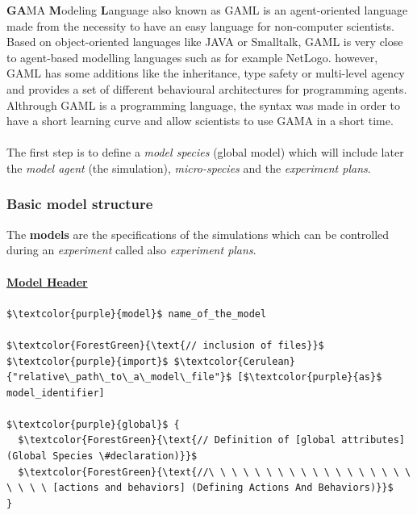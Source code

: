 \documentclass[12pt, a4paper]{memoir} %
\begin{document}
			\textbf{GA}MA \textbf{M}odeling \textbf{L}anguage also known as GAML is an agent-oriented language made from the necessity to have an easy language for non-computer scientists.
			Based on object-oriented languages like JAVA or Smalltalk, GAML is very close to agent-based modelling languages such as for example NetLogo. however, GAML has some additions like the
			inheritance, type safety or multi-level agency and provides a set of different behavioural architectures for programming agents.
			Althrough GAML is a programming language, the syntax was made in order to have a short learning curve and allow scientists to use GAMA in a short time.
			\paragraph{}
			The first step is to define a \textit{model species} (global model) which will include later the \textit{model agent} (the simulation), \textit{micro-species} and the \textit{experiment plans}.

			\subsubsection{Basic model structure}

				The \textbf{models} are the specifications of the simulations which can be controlled during an \textit{experiment} called also \textit{experiment plans}.

				\paragraph{}
				\underline{\textbf{Model Header}}
				\paragraph{}
				\begin{lstlisting}[mathescape,caption=Header model syntax.,label=code:header]
$\textcolor{purple}{model}$ name_of_the_model

$\textcolor{ForestGreen}{\text{// inclusion of files}}$
$\textcolor{purple}{import}$ $\textcolor{Cerulean}{"relative\_path\_to\_a\_model\_file"}$ [$\textcolor{purple}{as}$ model_identifier]

$\textcolor{purple}{global}$ {
  $\textcolor{ForestGreen}{\text{// Definition of [global attributes] (Global Species \#declaration)}}$
  $\textcolor{ForestGreen}{\text{//\ \ \ \ \ \ \ \ \ \ \ \ \ \ \ \ \ \ \ \ \ \ [actions and behaviors] (Defining Actions And Behaviors)}}$
}
				\end{lstlisting}
\end{document}
